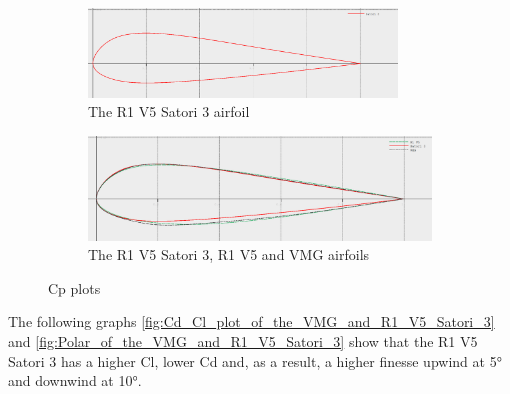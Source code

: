\begin{figure}[H]
\begin{subfigure}{1\linewidth}
\centering
\includegraphics[width=0.9\textwidth]{figures/2D steady simulations/airfoil design/satori 3.png}
\caption{The R1 V5 Satori 3 airfoil}
\label{fig:The_R1_V5_Satori_3_airfoil}
\end{subfigure}
\centering
\begin{subfigure}{0.9\linewidth}
\includegraphics[width=1.\textwidth]{figures/2D steady simulations/airfoil design/satori 3, R1V5 and VMG.png}
\caption{The R1 V5 Satori 3, R1 V5 and VMG airfoils}
\label{fig:The_R1_V5_Satori_3,_R1_V5_and_VMG_airfoils}
\end{subfigure}
\caption{Cp plots}
\label{fig:Comparison between different airfoil designs}
\end{figure}

The following graphs \ref{fig:Cd_Cl_plot_of_the_VMG_and_R1_V5_Satori_3} and \ref{fig:Polar_of_the_VMG_and_R1_V5_Satori_3} show that the R1 V5 Satori 3 has a higher Cl, lower Cd and, as a result, a higher finesse upwind at 5° and downwind at 10°. 


